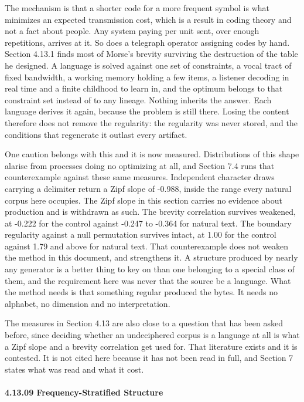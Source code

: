 The mechanism is that a shorter code for a more frequent symbol is what minimizes an expected transmission cost, which is a result in coding theory and not a fact about people. Any system paying per unit sent, over enough repetitions, arrives at it. So does a telegraph operator assigning codes by hand. Section 4.13.1 finds most of Morse's brevity surviving the destruction of the table he designed. A language is solved against one set of constraints, a vocal tract of fixed bandwidth, a working memory holding a few items, a listener decoding in real time and a finite childhood to learn in, and the optimum belongs to that constraint set instead of to any lineage. Nothing inherits the answer. Each language derives it again, because the problem is still there. Losing the content therefore does not remove the regularity: the regularity was never stored, and the conditions that regenerate it outlast every artifact.

One caution belongs with this and it is now measured. Distributions of this shape alarise from processes doing no optimizing at all, and Section 7.4 runs that counterexample against these same measures. Independent character draws carrying a delimiter return a Zipf slope of -0.988, inside the range every natural corpus here occupies. The Zipf slope in this section carries no evidence about production and is withdrawn as such. The brevity correlation survives weakened, at -0.222 for the control against -0.247 to -0.364 for natural text. The boundary regularity against a null permutation survives intact, at 1.00 for the control against 1.79 and above for natural text. That counterexample does not weaken the method in this document, and strengthens it. A structure produced by nearly any generator is a better thing to key on than one belonging to a special class of them, and the requirement here was never that the source be a language. What the method needs is that something regular produced the bytes. It needs no alphabet, no dimension and no interpretation.

The measures in Section 4.13 are also close to a question that has been asked before, since deciding whether an undeciphered corpus is a language at all is what a Zipf slope and a brevity correlation get used for. That literature exists and it is contested. It is not cited here because it has not been read in full, and Section 7 states what was read and what it cost.

\paragraph{4.13.09 Frequency-Stratified Structure}

